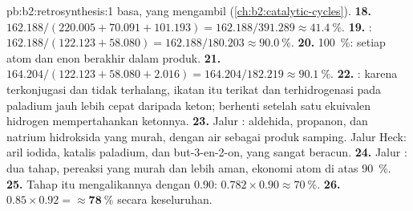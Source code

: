 \begin{solution}{pb:b2:retrosynthesis:1}
basa, yang mengambil 
(\cref{ch:b2:catalytic-cycles}).
\textbf{18.} $162.188/(220.005 + 70.091 + 101.193) = 162.188/391.289 \approx 41.4~\%$.
\textbf{19.} : $162.188/(122.123 + 58.080) = 162.188/180.203
\approx 90.0~\%$.
\textbf{20.} 100~\%: setiap atom  dan enon berakhir dalam produk.
\textbf{21.} $164.204/(122.123 + 58.080 + 2.016) = 164.204/182.219 \approx 90.1~\%$.
\textbf{22.} : karena terkonjugasi dan tidak terhalang, ikatan itu
terikat dan terhidrogenasi pada paladium jauh lebih cepat daripada 
keton; berhenti setelah satu ekuivalen hidrogen mempertahankan ketonnya.
\textbf{23.} Jalur : aldehida, propanon, dan natrium hidroksida yang
murah, dengan air sebagai produk samping. Jalur Heck: aril iodida, katalis
paladium, dan but-3-en-2-on, yang sangat beracun.
\textbf{24.} Jalur : dua tahap, pereaksi yang murah dan lebih aman,
ekonomi atom di atas 90~\%.
\textbf{25.} Tahap itu mengalikannya dengan 0.90: $0.782 \times 0.90 \approx 70~\%$.
\textbf{26.} $0.85 \times 0.92 = \boldsymbol{\approx 78~\%}$ secara keseluruhan.
\end{solution}
